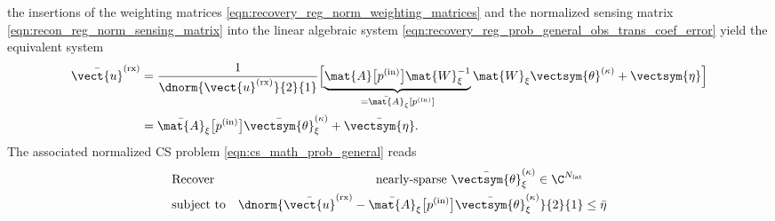 the insertions of
the weighting matrices
\eqref{eqn:recovery_reg_norm_weighting_matrices} and
the normalized sensing matrix
\eqref{eqn:recon_reg_norm_sensing_matrix} into
the linear algebraic system
\eqref{eqn:recovery_reg_prob_general_obs_trans_coef_error} yield
the equivalent system
\begin{equation}
\begin{split}
  \bar{\vect{u}}^{(\text{rx})}
  &=
  \frac{ 1 }{ \dnorm{ \vect{u}^{(\text{rx})} }{2}{1} }
  \Bigl[
    \underbrace{
      \mat{A}\bigl[ p^{(\text{in})} \bigr]
      \mat{W}_{\xi}^{-1}
    }_{ = \bar{\mat{A}}_{\xi}[ p^{(\text{in})} ] }
    \mat{W}_{\xi}
    \vectsym{\theta}^{(\kappa)}
    +
    \vectsym{\eta}
  \Bigr]\\
  &=
  \bar{\mat{A}}_{\xi}\bigl[ p^{(\text{in})} \bigr]
  \bar{\vectsym{\theta}}_{\xi}^{(\kappa)}
  +
  \bar{\vectsym{\eta}}.
\end{split}
\label{eqn:recovery_reg_norm_obs_trans_coef_error}
\end{equation}
The associated normalized \ac{CS} problem
\eqref{eqn:cs_math_prob_general} reads
\begin{equation}
\begin{alignedat}{2}
  &
  \text{Recover}
  &
  \text{nearly-sparse }
  \bar{\vectsym{\theta}}_{\xi}^{(\kappa)}
  \in
  \C^{ N_{\text{lat}} }\\
  &
  \text{subject to}
  \quad
  &
  \dnorm{ \bar{\vect{u}}^{(\text{rx})} - \bar{\mat{A}}_{\xi}\bigl[ p^{(\text{in})} \bigr] \bar{\vectsym{\theta}}_{\xi}^{(\kappa)} }{2}{1}
  &\leq
  \bar{\eta}
\end{alignedat}
\label{eqn:recovery_reg_norm_prob_general}
\end{equation}
